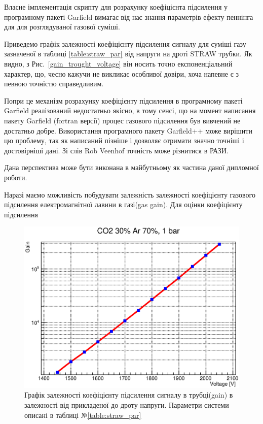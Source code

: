 \documentclass[]{article}
\begin{document}
	Власне імплементація скрипту для розрахунку коефіцієнта підсилення у програмному пакеті Garfield вимагає від нас знання параметрів ефекту пеннінга для \cite{} для розглядуваної газової суміші.
	
	Приведемо графік залежності коефіцієнту підсилення сигналу для суміші газу зазначеної в таблиці \ref{table:straw_par} від напруги на дроті STRAW трубки.  Як видно, з Рис.~\ref{gain_trought_voltage} він носить точно експоненціальний характер, що, чесно кажучи не викликає особливої довіри, хоча напевне є з певною точністю справедливим. 
	
	Попри це механізм розрахунку коефіцієнту підсилення в програмному пакеті Garfield реалізований недостатньо якісно, в тому сенсі, що на момент написання пакету Garfield (fortran версії) процес газового підсилення був вивчений не достатньо добре. Використання програмного пакету Garfield++ може вирішити цю проблему, так як написаний пізніше і дозволяє отримати значно точніші і достовірніші дані. Зі слів Rob Veenhof точність може різнитися в РАЗИ.
	
	Дана перспектива може бути виконана в майбутньому як частина даної дипломної роботи.
	
	Наразі маємо можливість побудувати залежність залежності коефіцієнту газового підсилення електромагнітної лавини в газі(gas gain). Для оцінки коефіцієнту підсилення 
	
	\begin{figure}[h]
	\centering
	 \includegraphics[width=\textwidth]{gain_1450_2050V}
	\caption{ Графік залежності коефіцієнту підсилення сигналу в трубці(gain) в залежності від прикладеної до дроту напруги. Параметри системи описані в таблиці №\ref{table:straw_par}}
	\label{fig:gain_trought_voltage}
	\end{figure}
	
\end{document}

